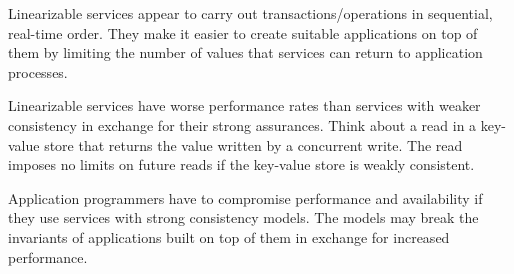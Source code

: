 Linearizable services appear to carry out transactions/operations in sequential, real-time order. They make it easier to create suitable applications on top of them by limiting the number of values that services can return to application processes.

Linearizable services have worse performance rates than services with weaker consistency in exchange for their strong assurances. Think about a read in a key-value store that returns the value written by a concurrent write. The read imposes no limits on future reads if the key-value store is weakly consistent.

Application programmers have to compromise performance and availability if they use services with strong consistency models. The models may break the invariants of applications built on top of them in exchange for increased performance.

